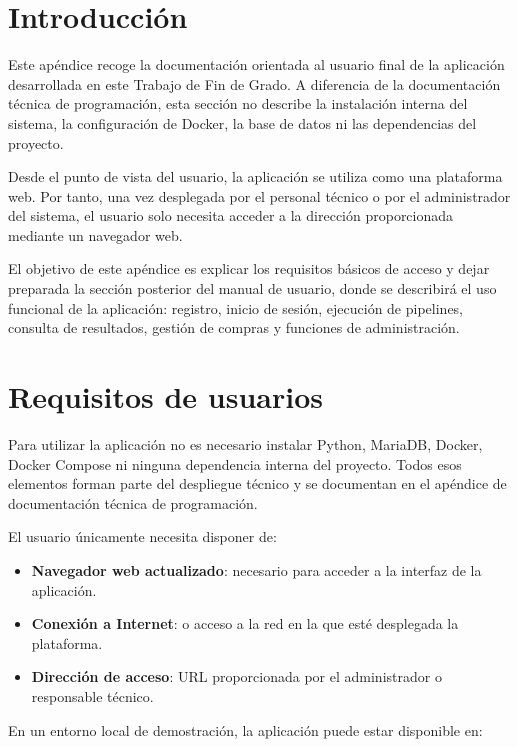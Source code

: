
\section{Introducción}

Este apéndice recoge la documentación orientada al usuario final de la aplicación desarrollada en este Trabajo de Fin de Grado. A diferencia de la documentación técnica de programación, esta sección no describe la instalación interna del sistema, la configuración de Docker, la base de datos ni las dependencias del proyecto.

Desde el punto de vista del usuario, la aplicación se utiliza como una plataforma web. Por tanto, una vez desplegada por el personal técnico o por el administrador del sistema, el usuario solo necesita acceder a la dirección proporcionada mediante un navegador web.

El objetivo de este apéndice es explicar los requisitos básicos de acceso y dejar preparada la sección posterior del manual de usuario, donde se describirá el uso funcional de la aplicación: registro, inicio de sesión, ejecución de pipelines, consulta de resultados, gestión de compras y funciones de administración.

\section{Requisitos de usuarios}

Para utilizar la aplicación no es necesario instalar Python, MariaDB, Docker, Docker Compose ni ninguna dependencia interna del proyecto. Todos esos elementos forman parte del despliegue técnico y se documentan en el apéndice de documentación técnica de programación.

El usuario únicamente necesita disponer de:

\begin{itemize}
	\item \textbf{Navegador web actualizado}: necesario para acceder a la interfaz de la aplicación.
	\item \textbf{Conexión a Internet}: o acceso a la red en la que esté desplegada la plataforma.
	\item \textbf{Dirección de acceso}: URL proporcionada por el administrador o responsable técnico.
\end{itemize}

En un entorno local de demostración, la aplicación puede estar disponible en:

